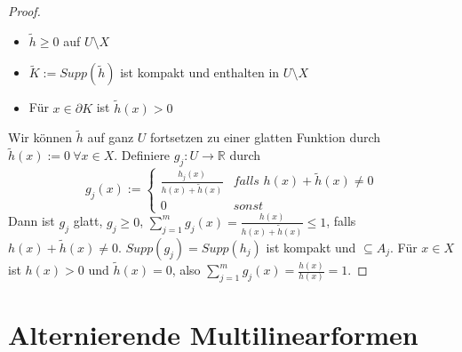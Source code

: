 \documentclass[10pt,a4paper]{report}
\begin{document}
\begin{proof}
  \begin{itemize}
  \item $\tilde{h} \ge 0$ auf $U \setminus X$
  \item $\tilde{K} := Supp(\tilde{h})$ ist kompakt und enthalten in $U \setminus X$
  \item Für $x \in \partial K$ ist $\tilde{h}(x) > 0$
  \end{itemize}
  Wir können $\tilde{h}$ auf ganz $U$ fortsetzen zu einer glatten Funktion durch $\tilde{h}(x) := 0\ \forall x \in X$.
  Definiere $g_{j} : U \rightarrow \mathbb{R}$ durch
  \begin{equation}
    g_{j}(x) := \begin{cases}
      \frac{h_{j}(x)}{h(x) + \tilde{h}(x)} & \textit{falls $h(x) + \tilde{h}(x) \ne 0$}\\
      0 & \textit{sonst}
    \end{cases}
  \end{equation}
  Dann ist $g_{j}$ glatt, $g_{j} \ge 0$, $\sum_{j = 1}^{m} g_{j}(x) = \frac{h(x)}{h(x) + \tilde{h}(x)} \le 1$, falls $h(x) + \tilde{h}(x) \ne 0$.
  $Supp(g_{j}) = Supp(h_{j})$ ist kompakt und $\subseteq A_{j}$.
  Für $x \in X$ ist $h(x) > 0$ und $\tilde{h}(x) = 0$, also $\sum_{j = 1}^{m} g_{j}(x) = \frac{h(x)}{h(x)} = 1$.
\end{proof}

\section{Alternierende Multilinearformen}
\end{document}
